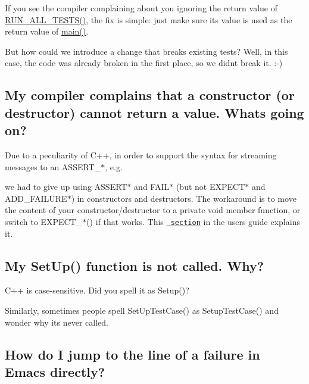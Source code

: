 If you see the compiler complaining about you ignoring the return value of {\ttfamily \mbox{\hyperlink{googletest-master_2googletest_2include_2gtest_2gtest_8h_a853a3792807489591d3d4a2f2ff9359f}{R\+U\+N\+\_\+\+A\+L\+L\+\_\+\+T\+E\+S\+T\+S()}}}, the fix is simple\+: just make sure its value is used as the return value of {\ttfamily \mbox{\hyperlink{_be_01vektoriaus_2main_8cpp_ae66f6b31b5ad750f1fe042a706a4e3d4}{main()}}}.

But how could we introduce a change that breaks existing tests? Well, in this case, the code was already broken in the first place, so we didn\textquotesingle{}t break it. \+:-\/)

\subsection*{My compiler complains that a constructor (or destructor) cannot return a value. What\textquotesingle{}s going on?}

Due to a peculiarity of C++, in order to support the syntax for streaming messages to an {\ttfamily A\+S\+S\+E\+R\+T\+\_\+$\ast$}, e.\+g.


\begin{DoxyCode}{0}
\end{DoxyCode}


we had to give up using {\ttfamily A\+S\+S\+E\+R\+T$\ast$} and {\ttfamily F\+A\+I\+L$\ast$} (but not {\ttfamily E\+X\+P\+E\+C\+T$\ast$} and {\ttfamily A\+D\+D\+\_\+\+F\+A\+I\+L\+U\+R\+E$\ast$}) in constructors and destructors. The workaround is to move the content of your constructor/destructor to a private void member function, or switch to {\ttfamily E\+X\+P\+E\+C\+T\+\_\+$\ast$()} if that works. This \href{advanced.md\#assertion-placement}{\texttt{ section}} in the user\textquotesingle{}s guide explains it.

\subsection*{My Set\+Up() function is not called. Why?}

C++ is case-\/sensitive. Did you spell it as {\ttfamily Setup()}?

Similarly, sometimes people spell {\ttfamily Set\+Up\+Test\+Case()} as {\ttfamily Setup\+Test\+Case()} and wonder why it\textquotesingle{}s never called.

\subsection*{How do I jump to the line of a failure in Emacs directly?}

